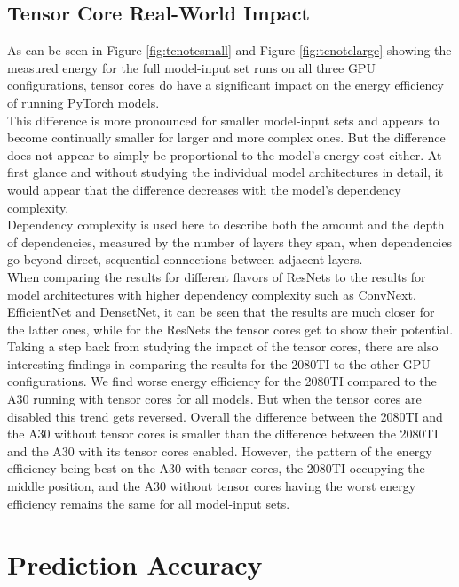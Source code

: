 \subsection{Tensor Core Real-World Impact}
As can be seen in Figure \ref{fig:tcnotcsmall} and Figure \ref{fig:tcnotclarge} showing the measured energy for the full model-input set runs on all three GPU configurations, tensor cores do have a significant impact on the energy efficiency of running PyTorch models. \\
This difference is more pronounced for smaller model-input sets and appears to become continually smaller for larger and more complex ones. But the difference does not appear to simply be proportional to the model's energy cost either. At first glance and without studying the individual model architectures in detail, it would appear that the difference decreases with the model's dependency complexity. \\
Dependency complexity is used here to describe both the amount and the depth of dependencies, measured by the number of layers they span, when dependencies go beyond direct, sequential connections between adjacent layers.\\
When comparing the results for different flavors of ResNets to the results for model architectures with higher dependency complexity such as ConvNext, EfficientNet and DensetNet, it can be seen that the results are much closer for the latter ones, while for the ResNets the tensor cores get to show their potential. \\
Taking a step back from studying the impact of the tensor cores, there are also interesting findings in comparing the results for the 2080TI to the other GPU configurations. We find worse energy efficiency for the 2080TI compared to the A30 running with tensor cores for all models. But when the tensor cores are disabled this trend gets reversed. Overall the difference between the 2080TI and the A30 without tensor cores is smaller than the difference between the 2080TI and the A30 with its tensor cores enabled. However, the pattern of the energy efficiency being best on the A30 with tensor cores, the 2080TI occupying the middle position, and the A30 without tensor cores having the worst energy efficiency remains the same for all model-input sets.


\section{Prediction Accuracy}

